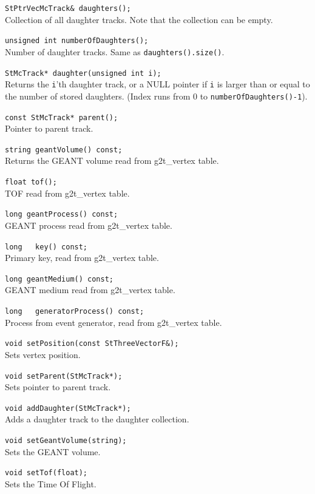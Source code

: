 \begin{Entry}
    \verb+StPtrVecMcTrack& daughters();+\\
    Collection of all daughter tracks. Note that
    the collection can be empty.

    \verb+unsigned int numberOfDaughters();+\\
    Number of daughter tracks. Same as {\tt daughters().size()}.

    \verb+StMcTrack* daughter(unsigned int i);+\\
    Returns the {\tt i}'th daughter track, or a NULL pointer
    if {\tt i} is larger than or equal to the number of stored daughters.
    (Index runs from 0 to {\tt numberOfDaughters()-1}).

    \verb+const StMcTrack* parent();+\\
    Pointer to parent track.
    
    \verb+string geantVolume() const;+\\
    Returns the GEANT volume read from g2t\_vertex table.

    \verb+float tof();+\\
    TOF read from g2t\_vertex table.

    \verb+long geantProcess() const;+\\
    GEANT process read from g2t\_vertex table.

    \verb+long   key() const;+\\
    Primary key, read from g2t\_vertex table.

    \verb+long geantMedium() const;+\\
    GEANT medium read from g2t\_vertex table.

    \verb+long   generatorProcess() const;+\\
    Process from event generator, read from g2t\_vertex table.


    \verb+void setPosition(const StThreeVectorF&);+\\
    Sets vertex position.

    \verb+void setParent(StMcTrack*);+\\
    Sets pointer to parent track.

    \verb+void addDaughter(StMcTrack*); +\\
    Adds a daughter track to the daughter collection.

    \verb+void setGeantVolume(string); +\\
    Sets the GEANT volume.

    \verb+void setTof(float); +\\
    Sets the Time Of Flight.


\end{Entry}
